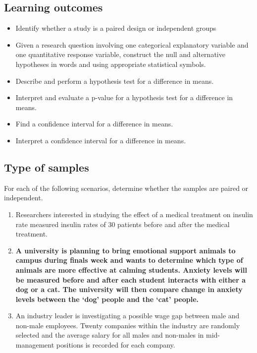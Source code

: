 \documentclass[
]{report}
\begin{document}

\hypertarget{learning-outcomes-27}{%
\subsection{Learning outcomes}\label{learning-outcomes-27}}

\begin{itemize}
\item
  Identify whether a study is a paired design or independent groups
\item
  Given a research question involving one categorical explanatory variable and one quantitative response variable, construct the null and alternative hypotheses
  in words and using appropriate statistical symbols.
\item
  Describe and perform a hypothesis test for a difference in means.
\item
  Interpret and evaluate a p-value for a hypothesis test for a difference in means.
\item
  Find a confidence interval for a difference in means.
\item
  Interpret a confidence interval for a difference in means.
\end{itemize}

\hypertarget{type-of-samples}{%
\subsection{Type of samples}\label{type-of-samples}}

For each of the following scenarios, determine whether the samples are paired or independent.

\begin{enumerate}
\def\labelenumi{\arabic{enumi}.}
\item
  Researchers interested in studying the effect of a medical treatment on insulin rate measured insulin rates of 30 patients before and after the medical treatment.
  \vspace{0.3in}
\item
  \textbf{A university is planning to bring emotional support animals to campus during finals week and wants to determine which type of animals are more effective at calming students. Anxiety levels will be measured before and after each student interacts with either a dog or a cat. The university will then compare change in anxiety levels between the `dog' people and the `cat' people.}
  \vspace{0.3in}
\item
  An industry leader is investigating a possible wage gap between male and non-male employees. Twenty companies within the industry are randomly selected and the average salary for all males and non-males in mid-management positions is recorded for each company.
  \vspace{0.3in}
\end{enumerate}
\end{document}
